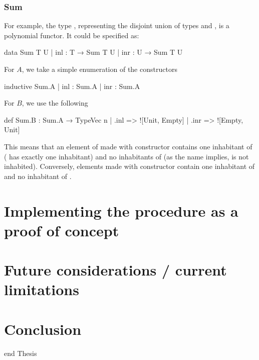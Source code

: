 \documentclass[titlepage]{report}
\newenvironment{leanhidden}{\expandafter\comment}{\expandafter\endcomment}
\begin{document}
\subsection*{Sum}
For example, the type , representing the disjoint union of types  and ,
is a polynomial functor. It could be specified as:
\begin{leancode}
    data Sum T U
    | inl : T → Sum T U
    | inr : U → Sum T U
\end{leancode}
For $A$, we take a simple enumeration of the constructors
\begin{leancode}
    inductive Sum.A
    | inl : Sum.A
    | inr : Sum.A
\end{leancode}
For $B$, we use the following
\begin{leancode}
    def Sum.B : Sum.A → TypeVec n
    | .inl => ![Unit, Empty]
    | .inr => ![Empty, Unit]
\end{leancode}
This means that an element of  made with constructor  contains one inhabitant of  ( has exactly one inhabitant) and no inhabitants of  (as the name implies,  is not inhabited). Conversely, elements made with constructor  contain one inhabitant of  and no inhabitant of .





















\chapter{Implementing the procedure as a proof of concept}
\label{ch:implementing}










\chapter{Future considerations / current limitations}
\label{ch:limitations}







\chapter{Conclusion}
\label{ch:conclusion}















\begin{leanhidden}
    end Thesis
\end{leanhidden}
\end{document}
